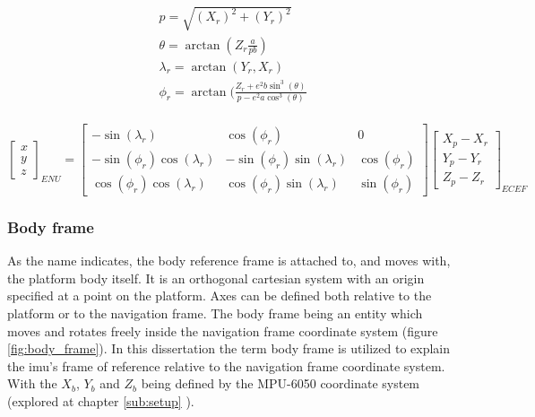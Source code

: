 \begin{equation}
    \begin{gathered}
        p = \sqrt{(X_r)^2 + (Y_r)^2} \\
        \theta = \arctan(Z_r\frac{a}{pb} ) \\
        \lambda_r = \arctan(Y_r,X_r) \\
        \phi_r = \arctan(\frac{Z_r + e^2 b\sin^3(\theta)}{p - e^2 a \cos^3(\theta )}  \\
    \end{gathered}
    \label{eq:transformation}
\end{equation}

\begin{equation}
    \begin{bmatrix}
        x \\
        y \\
        z
    \end{bmatrix}_{ENU}
    =
    \begin{bmatrix}
        -\sin(\lambda_r)             & \cos( \phi_r)                 & 0            \\
        -\sin(\phi_r)\cos(\lambda_r) & -\sin( \phi_r)\sin(\lambda_r) & \cos(\phi_r) \\
        \cos(\phi_r)\cos(\lambda_r)  & \cos(\phi_r) \sin(\lambda_r)  & \sin(\phi_r)
    \end{bmatrix}
    \begin{bmatrix}
        X_p - X_r \\
        Y_p - Y_r \\
        Z_p - Z_r
    \end{bmatrix}_{ECEF}
    \label{eq:transformation_results}
\end{equation}

\subsubsection{Body frame}

As the name indicates, the body reference frame is attached to, and moves with, the platform body itself. It is an orthogonal cartesian system with an origin specified at a point on the platform. Axes can be defined both relative to the platform or to the navigation frame. The body frame being an entity which moves and rotates freely inside the navigation frame coordinate system (figure \ref{fig:body_frame}). In this dissertation the term body frame is utilized to explain the \acrshort{imu}'s frame of reference relative to the navigation frame coordinate system. With the $X_b$, $Y_b$ and $Z_b$ being defined by the MPU-6050 coordinate system (explored at chapter \ref{sub:setup} ).

